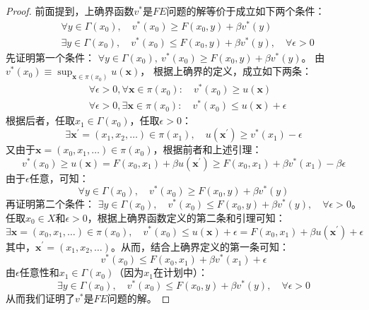 \begin{proof}
    前面提到，上确界函数$v^*$是$FE$问题的解等价于成立如下两个条件：
    $$
    \begin{aligned}
        &\forall y \in \Gamma\left(x_0\right),\quad v^*\left(x_0\right)\geq F\left(x_0,y\right) 
            + \beta v^*\left(y\right)\\
        &\exists y\in \Gamma\left(x_0\right),\quad v^*\left(x_0\right)\leq F\left(x_0,y\right) 
            + \beta v^*\left(y\right), \quad \forall \epsilon > 0
    \end{aligned}
    $$
    先证明第一个条件：
    $\forall y \in \Gamma\left(x_0\right),~ v^*\left(x_0\right)\geq F\left(x_0,y\right) + \beta v^*\left(y\right)$。
    由$v^*\left(x_0\right)\equiv \sup _{\boldsymbol{x}\in\pi\left(x_0\right)} u\left(\boldsymbol{x}\right)$，
    根据上确界的定义，成立如下两条：
    \begin{equation*}
        \begin{aligned}
            &\forall \epsilon > 0, \forall \boldsymbol{x}\in \pi\left(x_0\right): 
                \quad v^*\left(x_0\right)\geq u\left(\boldsymbol{x}\right) \\
            &\forall \epsilon > 0, \exists \boldsymbol{x}\in\pi\left(x_0\right): 
                \quad v^*\left(x_0\right)\leq u\left(\boldsymbol{x}\right)+\epsilon
        \end{aligned}
    \end{equation*}
    根据后者，任取$x_1 \in \Gamma\left(x_0\right)$，任取$\epsilon > 0$：
    $$\exists \boldsymbol{x}^{\prime}=\left(x_1,x_2,\dots\right) \in \pi\left(x_1\right), 
        \quad u\left(\boldsymbol{x}^{\prime}\right)\geq v^*\left(x_1\right)-\epsilon$$
    又由于$\boldsymbol{x}=\left(x_0,x_1,\dots\right)\in \pi\left(x_0\right)$，根据前者和上述引理：
    $$
    v^*\left(x_0\right)\geq u\left(\boldsymbol{x}\right)=F\left(x_0,x_1\right)+\beta u\left(\boldsymbol{x}^{\prime}\right)
        \geq F\left(x_0,x_1\right)+\beta v^*\left(x_1\right)-\beta \epsilon
    $$
    由于$\epsilon$任意，可知：
    $$
    \forall y \in \Gamma\left(x_0\right),\quad v^*\left(x_0\right)\geq F\left(x_0,y\right) + \beta v^*\left(y\right)
    $$
    再证明第二个条件：
    $\exists y\in \Gamma\left(x_0\right),\quad v^*\left(x_0\right)\leq F\left(x_0,y\right) 
        + \beta v^*\left(y\right), \quad \forall \epsilon > 0$。
    任取$x_0\in X$和$\epsilon>0$，根据上确界函数定义的第二条和引理可知：
    $$
    \exists \boldsymbol{x}=\left(x_0,x_1,\dots\right)\in \pi\left(x_0\right), 
        \quad v^*\left(x_0\right)\leq u\left(\boldsymbol{x}\right)+\epsilon 
            = F\left(x_0,x_1\right)+\beta u\left(\boldsymbol{x}^{\prime}\right)+\epsilon
    $$
    其中，$\boldsymbol{x}^{\prime}= \left(x_1,x_2,\dots\right)$。从而，结合上确界定义的第一条可知：
    $$
    v^*\left(x_0\right)\leq F\left(x_0,x_1\right)+\beta v^*\left(x_1\right)+\epsilon 
    $$
    由$\epsilon$任意性和$x_1\in\Gamma\left(x_0\right)$（因为$x_1$在计划中）：
    $$
    \exists y\in \Gamma\left(x_0\right),\quad v^*\left(x_0\right)\leq F\left(x_0,y\right) 
        + \beta v^*\left(y\right), \quad \forall \epsilon > 0
    $$
    从而我们证明了$v^*$是$FE$问题的解。
\end{proof}

